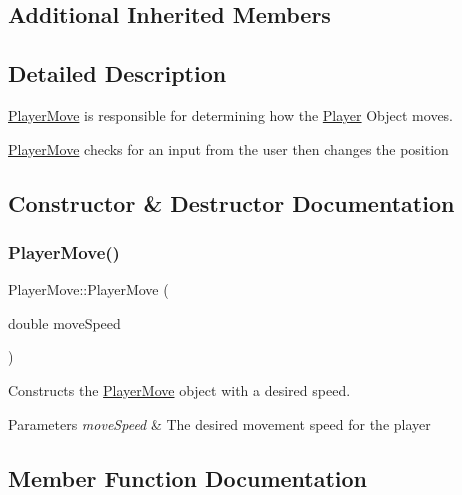 \subsection*{Additional Inherited Members}


\subsection{Detailed Description}
\hyperlink{class_player_move}{Player\+Move} is responsible for determining how the \hyperlink{class_player}{Player} Object moves. 

\hyperlink{class_player_move}{Player\+Move} checks for an input from the user then changes the position 

\subsection{Constructor \& Destructor Documentation}
\mbox{\label{class_player_move_afac691eb4cb3f0fbbf1876b5991e3a80}} 
\subsubsection{\texorpdfstring{Player\+Move()}{PlayerMove()}}
{\footnotesize\ttfamily Player\+Move\+::\+Player\+Move (\begin{DoxyParamCaption}\item[{double}]{move\+Speed }\end{DoxyParamCaption})}



Constructs the \hyperlink{class_player_move}{Player\+Move} object with a desired speed. 


\begin{DoxyParams}{Parameters}
{\em move\+Speed} & The desired movement speed for the player \\
\hline
\end{DoxyParams}


\subsection{Member Function Documentation}
\mbox{\label{class_player_move_a8118719df3dd369686b41a0ec77cd8e0}} 

